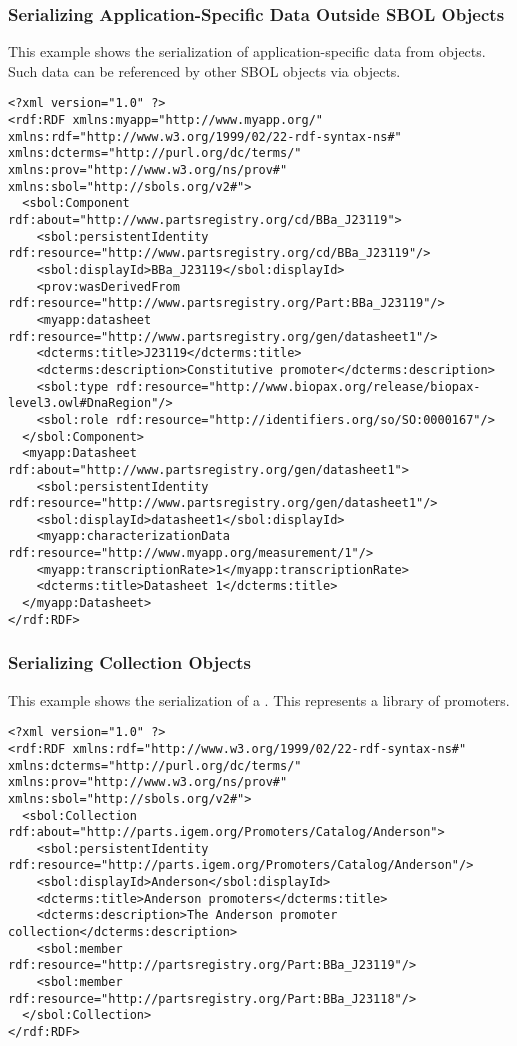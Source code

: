 \subsubsection{Serializing Application-Specific Data Outside SBOL Objects}
This example shows the serialization of application-specific data from  objects. Such data can be referenced by other SBOL objects via  objects.
\begin{lstlisting}
<?xml version="1.0" ?>
<rdf:RDF xmlns:myapp="http://www.myapp.org/" xmlns:rdf="http://www.w3.org/1999/02/22-rdf-syntax-ns#" xmlns:dcterms="http://purl.org/dc/terms/" xmlns:prov="http://www.w3.org/ns/prov#" xmlns:sbol="http://sbols.org/v2#">
  <sbol:Component rdf:about="http://www.partsregistry.org/cd/BBa_J23119">
    <sbol:persistentIdentity rdf:resource="http://www.partsregistry.org/cd/BBa_J23119"/>
    <sbol:displayId>BBa_J23119</sbol:displayId>
    <prov:wasDerivedFrom rdf:resource="http://www.partsregistry.org/Part:BBa_J23119"/>
    <myapp:datasheet rdf:resource="http://www.partsregistry.org/gen/datasheet1"/>
    <dcterms:title>J23119</dcterms:title>
    <dcterms:description>Constitutive promoter</dcterms:description>
    <sbol:type rdf:resource="http://www.biopax.org/release/biopax-level3.owl#DnaRegion"/>
    <sbol:role rdf:resource="http://identifiers.org/so/SO:0000167"/>
  </sbol:Component>
  <myapp:Datasheet rdf:about="http://www.partsregistry.org/gen/datasheet1">
    <sbol:persistentIdentity rdf:resource="http://www.partsregistry.org/gen/datasheet1"/>
    <sbol:displayId>datasheet1</sbol:displayId>
    <myapp:characterizationData rdf:resource="http://www.myapp.org/measurement/1"/>
    <myapp:transcriptionRate>1</myapp:transcriptionRate>
    <dcterms:title>Datasheet 1</dcterms:title>
  </myapp:Datasheet>
</rdf:RDF>
\end{lstlisting}


\subsubsection{Serializing Collection Objects}
This example shows the serialization of a . This  represents a library of promoters.
\begin{lstlisting}
<?xml version="1.0" ?>
<rdf:RDF xmlns:rdf="http://www.w3.org/1999/02/22-rdf-syntax-ns#" xmlns:dcterms="http://purl.org/dc/terms/" xmlns:prov="http://www.w3.org/ns/prov#" xmlns:sbol="http://sbols.org/v2#">
  <sbol:Collection rdf:about="http://parts.igem.org/Promoters/Catalog/Anderson">
    <sbol:persistentIdentity rdf:resource="http://parts.igem.org/Promoters/Catalog/Anderson"/>
    <sbol:displayId>Anderson</sbol:displayId>
    <dcterms:title>Anderson promoters</dcterms:title>
    <dcterms:description>The Anderson promoter collection</dcterms:description>
    <sbol:member rdf:resource="http://partsregistry.org/Part:BBa_J23119"/>
    <sbol:member rdf:resource="http://partsregistry.org/Part:BBa_J23118"/>
  </sbol:Collection>
</rdf:RDF>
\end{lstlisting}

